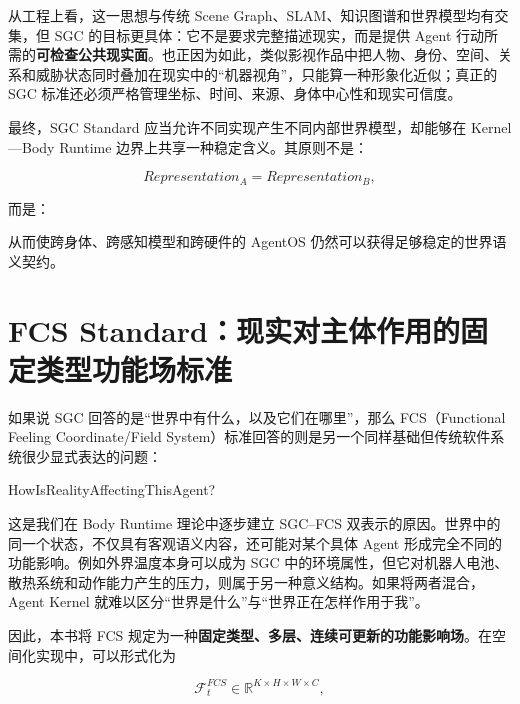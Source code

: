 \begin{statementbox}
\centering
{}
\end{statementbox}

从工程上看，这一思想与传统 Scene Graph、SLAM、知识图谱和世界模型均有交集，但 SGC 的目标更具体：它不是要求完整描述现实，而是提供 Agent 行动所需的\textbf{可检查公共现实面}。也正因为如此，类似影视作品中把人物、身份、空间、关系和威胁状态同时叠加在现实中的``机器视角''，只能算一种形象化近似；真正的 SGC 标准还必须严格管理坐标、时间、来源、身体中心性和现实可信度。

最终，SGC Standard 应当允许不同实现产生不同内部世界模型，却能够在 Kernel---Body Runtime 边界上共享一种稳定含义。其原则不是：

\[
Representation_A=Representation_B,
\]

而是：

\begin{statementbox}
\centering
{}
\end{statementbox}

从而使跨身体、跨感知模型和跨硬件的 AgentOS 仍然可以获得足够稳定的世界语义契约。

\section{FCS Standard：现实对主体作用的固定类型功能场标准}

如果说 SGC 回答的是``世界中有什么，以及它们在哪里''，那么 FCS（Functional Feeling Coordinate/Field System）标准回答的则是另一个同样基础但传统软件系统很少显式表达的问题：

\begin{statementbox}
HowIsRealityAffectingThisAgent?
\end{statementbox}

这是我们在 Body Runtime 理论中逐步建立 SGC--FCS 双表示的原因。世界中的同一个状态，不仅具有客观语义内容，还可能对某个具体 Agent 形成完全不同的功能影响。例如外界温度本身可以成为 SGC 中的环境属性，但它对机器人电池、散热系统和动作能力产生的压力，则属于另一种意义结构。如果将两者混合，Agent Kernel 就难以区分``世界是什么''与``世界正在怎样作用于我''。

因此，本书将 FCS 规定为一种\textbf{固定类型、多层、连续可更新的功能影响场}。在空间化实现中，可以形式化为

\[
\mathcal F_t^{FCS}
\in
\mathbb R^{K\times H\times W\times C},
\]

